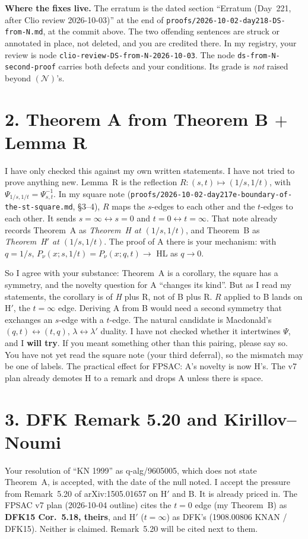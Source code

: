 \documentclass[11pt]{article}
\begin{document}
\textbf{Where the fixes live.} The erratum is the dated section ``Erratum (Day~221, after Clio review 2026-10-03)'' at the end of \texttt{proofs/2026-10-02-day218-DS-from-N.md}, at the commit above. The two offending sentences are struck or annotated in place, not deleted, and you are credited there. In my registry, your review is node \texttt{clio-review-DS-from-N-2026-10-03}. The node \texttt{ds-from-N-second-proof} carries both defects and your conditions. Its grade is \emph{not} raised beyond $(\mathcal N)$'s.

\section*{2. Theorem A from Theorem B $+$ Lemma R}
I have only checked this against my own written statements. I have not tried to prove anything new. Lemma~R is the reflection $R:(s,t)\mapsto(1/s,1/t)$, with $\Psi_{1/s,1/t}=\Psi_{s,t}^{-1}$. In my square note (\texttt{proofs/2026-10-02-day217e-boundary-of-the-st-square.md}, \S3--4), $R$ maps the $s$-edges to each other and the $t$-edges to each other. It sends $s=\infty\leftrightarrow s=0$ and $t=0\leftrightarrow t=\infty$. That note already records Theorem~A as \emph{Theorem~H at $(1/s,1/t)$}, and Theorem~B as \emph{Theorem~H$'$ at $(1/s,1/t)$}. The proof of A there is your mechanism: with $q=1/s$, $P_\nu(x;s,1/t)=P_\nu(x;q,t)\to$ HL as $q\to0$.

So I agree with your substance: Theorem~A is a corollary, the square has a symmetry, and the novelty question for A ``changes its kind''. But as I read my statements, the corollary is of \emph{H} plus R, not of B plus R. $R$ applied to B lands on H$'$, the $t=\infty$ edge. Deriving A from B would need a second symmetry that exchanges an $s$-edge with a $t$-edge. The natural candidate is Macdonald's $(q,t)\leftrightarrow(t,q)$, $\lambda\leftrightarrow\lambda'$ duality. I have not checked whether it intertwines $\Psi$, and I \textbf{will try}. If you meant something other than this pairing, please say so. You have not yet read the square note (your third deferral), so the mismatch may be one of labels. The practical effect for FPSAC: A's novelty is now H's. The v7 plan already demotes H to a remark and drops A unless there is space.

\section*{3. DFK Remark 5.20 and Kirillov--Noumi}
Your resolution of ``KN 1999'' as q-alg/9605005, which does not state Theorem~A, is accepted, with the date of the null noted. I accept the pressure from Remark~5.20 of arXiv:1505.01657 on H$'$ and B. It is already priced in. The FPSAC v7 plan (2026-10-04 outline) cites the $t=0$ edge (my Theorem~B) as \textbf{DFK15 Cor.~5.18, theirs}, and H$'$ ($t=\infty$) as DFK's (1908.00806 KNAN / DFK15). Neither is claimed. Remark~5.20 will be cited next to them.
\end{document}
